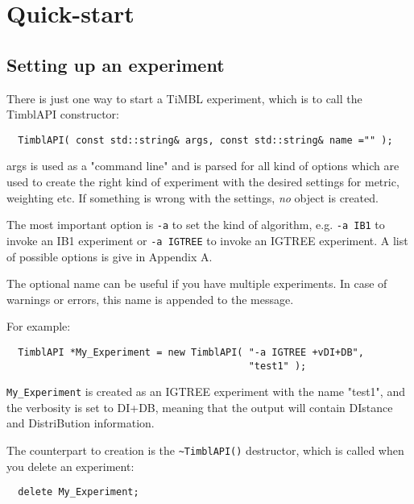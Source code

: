 \documentclass{report}
\begin{document}
\chapter{Quick-start}
\section{Setting up an experiment}

There is just one way to start a TiMBL experiment, which is to call
the TimblAPI constructor:

\begin{footnotesize}
\begin{verbatim}
  TimblAPI( const std::string& args, const std::string& name ="" );
\end{verbatim}
\end{footnotesize}

args is used as a "command line" and is parsed for all kind of options
which are used to create the right kind of experiment with the desired
settings for metric, weighting etc. If something is wrong with the
settings, {\em no}\/ object is created.

The most important option is {\tt -a}  to set the kind of algorithm,
e.g. {\tt -a IB1} to invoke an IB1 experiment or {\tt -a IGTREE} to invoke an IGTREE
experiment. A list of possible options is give in Appendix A.

The optional name can be useful if you have multiple experiments.
In case of warnings or errors, this name is appended to the message.

For example:

\begin{footnotesize}
\begin{verbatim}
  TimblAPI *My_Experiment = new TimblAPI( "-a IGTREE +vDI+DB", 
                                          "test1" );
\end{verbatim}
\end{footnotesize}

{\tt My\_Experiment} is created as an IGTREE experiment with the name
"test1", and the verbosity is set to DI+DB, meaning that the output
will contain DIstance and DistriBution information.

The counterpart to creation is the {\tt \~{ }TimblAPI()} destructor,
which is called when you delete an experiment:

\begin{footnotesize}
\begin{verbatim}
  delete My_Experiment;
\end{verbatim}
\end{footnotesize}
\end{document}
